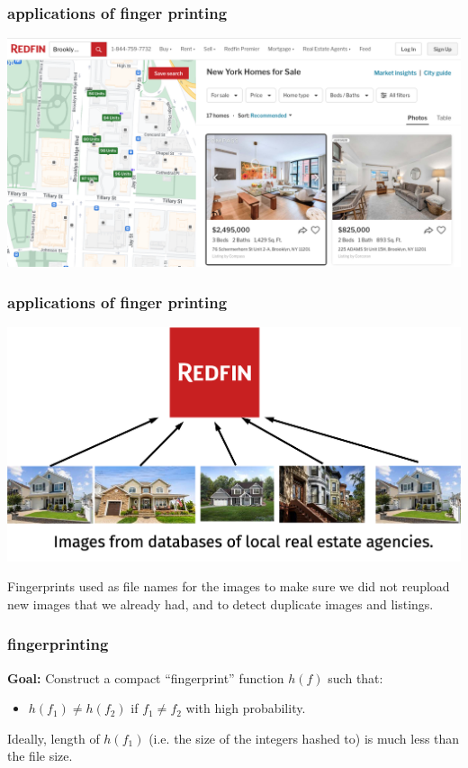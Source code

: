\documentclass[compress]{beamer}
\begin{document}
\begin{frame}[t]
	\frametitle{applications of finger printing}
	\begin{center}
		\includegraphics[width=\textwidth]{redfin_1.png}
	\end{center}
\end{frame}

\begin{frame}[t]
	\frametitle{applications of finger printing}
	\begin{center}
		\includegraphics[width=\textwidth]{redfin_2.png}
	\end{center}
	
	Fingerprints used as file names for the images to make sure we did not reupload new images that we already had, and to detect duplicate images and listings.
\end{frame}

\begin{frame}
	\frametitle{fingerprinting}
	\textbf{Goal:} Construct a compact ``fingerprint'' function $h(f)$ such that:
	\begin{itemize}
		\item $h(f_1) \neq h(f_2)$ if $f_1 \neq f_2$ with high probability.
	\end{itemize}
\vspace{1em}
	Ideally, length of $h(f_1)$ (i.e. the size of the integers hashed to) is much less than the file size. 
\end{frame}
\end{document}

